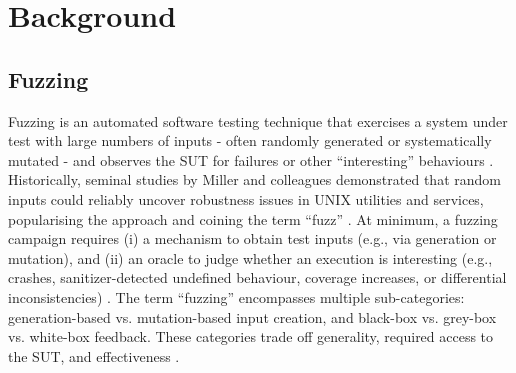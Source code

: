 \chapter{Background}


\section{Fuzzing}

Fuzzing is an automated software testing technique that exercises a system under test with large numbers of inputs - often randomly generated or systematically mutated - and observes the SUT for failures or other ``interesting'' behaviours \cite{miller_1990_an,miller_2006_fuzz}. Historically, seminal studies by Miller and colleagues demonstrated that random inputs could reliably uncover robustness issues in UNIX utilities and services, popularising the approach and coining the term ``fuzz'' \cite{miller_1990_an,miller_2006_fuzz}. At minimum, a fuzzing campaign requires (i) a mechanism to obtain test inputs (e.g., via generation or mutation), and (ii) an oracle to judge whether an execution is interesting (e.g., crashes, sanitizer-detected undefined behaviour, coverage increases, or differential inconsistencies) \cite{bhme_2016_coveragebased,serebryany_2012_addresssanitizer,llvmproject_2015_memorysanitizer,llvmproject_2015_undefinedbehaviorsanitizer,serebryany_2009_threadsanitizer,le_2014_compiler}. The term ``fuzzing'' encompasses multiple sub-categories: generation-based vs. mutation-based input creation, and black-box vs. grey-box vs. white-box feedback. These categories trade off generality, required access to the SUT, and effectiveness \cite{miller_2006_fuzz,bhme_2016_coveragebased}.

